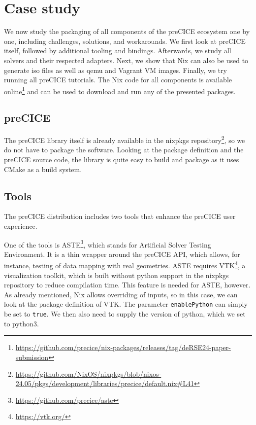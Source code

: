 \documentclass{eceasst}
\begin{document}
\section{Case study}
\label{sec:results}

We now study the packaging of all components of the preCICE ecosystem one by one, including challenges, solutions, and workarounds.
We first look at preCICE itself, followed by additional tooling and bindings.
Afterwards, we study all solvers and their respected adapters.
Next, we show that Nix can also be used to generate iso files as well as qemu and Vagrant VM images. Finally, we try running all preCICE tutorials.
The Nix code for all components is available online\footnote{\url{https://github.com/precice/nix-packages/releases/tag/deRSE24-paper-submission}} and can be used to download and run any of the presented packages.

\subsection{preCICE}

The preCICE library itself is already available in the nixpkgs repository\footnote{\url{https://github.com/NixOS/nixpkgs/blob/nixos-24.05/pkgs/development/libraries/precice/default.nix\#L41}}, so we do not have to package the software.
Looking at the package definition and the preCICE source code, the library is quite easy to build and package as it uses CMake as a build system.

\subsection{Tools}

The preCICE distribution includes two tools that enhance the preCICE user experience.

One of the tools is ASTE\footnote{\url{https://github.com/precice/aste}}, which stands for Artificial Solver Testing Environment. It is a thin wrapper around the preCICE API, which allows, for instance, testing of data mapping with real geometries.
ASTE requires VTK\footnote{\url{https://vtk.org/}}, a visualization toolkit, which is built without python support in the nixpkgs repository to reduce compilation time.
This feature is needed for ASTE, however.
As already mentioned, Nix allows overriding of inputs, so in this case, we can look at the package definition of VTK.
The parameter \texttt{enablePython} can simply be set to \texttt{true}. We then also need to supply the version of python, which we set to python3.
\end{document}
